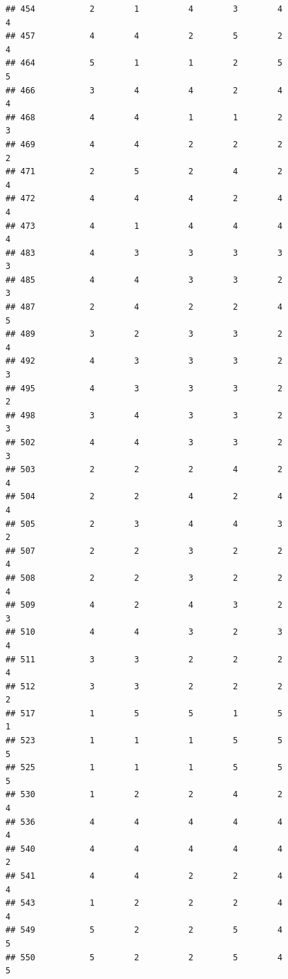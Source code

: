 \documentclass[
]{article}
\begin{document}
\begin{verbatim}
## 454           2        1          4        3        4               4
## 457           4        4          2        5        2               4
## 464           5        1          1        2        5               5
## 466           3        4          4        2        4               4
## 468           4        4          1        1        2               3
## 469           4        4          2        2        2               2
## 471           2        5          2        4        2               4
## 472           4        4          4        2        4               4
## 473           4        1          4        4        4               4
## 483           4        3          3        3        3               3
## 485           4        4          3        3        2               3
## 487           2        4          2        2        4               5
## 489           3        2          3        3        2               4
## 492           4        3          3        3        2               3
## 495           4        3          3        3        2               2
## 498           3        4          3        3        2               3
## 502           4        4          3        3        2               3
## 503           2        2          2        4        2               4
## 504           2        2          4        2        4               4
## 505           2        3          4        4        3               2
## 507           2        2          3        2        2               4
## 508           2        2          3        2        2               4
## 509           4        2          4        3        2               3
## 510           4        4          3        2        3               4
## 511           3        3          2        2        2               4
## 512           3        3          2        2        2               2
## 517           1        5          5        1        5               1
## 523           1        1          1        5        5               5
## 525           1        1          1        5        5               5
## 530           1        2          2        4        2               4
## 536           4        4          4        4        4               4
## 540           4        4          4        4        4               2
## 541           4        4          2        2        4               4
## 543           1        2          2        2        4               4
## 549           5        2          2        5        4               5
## 550           5        2          2        5        4               5

\end{verbatim}
\end{document}
